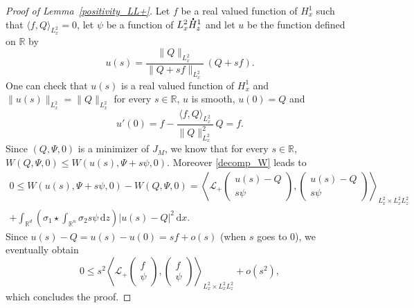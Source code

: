 \documentclass[10pt]{amsart}
\theoremstyle{definition}
\newcommand*{\overbigdot}[1]{%
\accentset{\mbox{\large\bfseries .}}{#1}}
\newenvironment{ProofOf}[1]{\begin{proof}[Proof of #1]}{\end{proof}}
\newcommand{\R}{\mathbb{R}}
\newcommand{\ud}{\, {\mathrm{d}}}
\begin{document}
\begin{ProofOf}{Lemma~\ref{positivity_LL+}}
Let $f$ be a real valued function of $H_{x}^{1}$ such that $\langle f,Q\rangle_{L_{x}^{2}}=0$, let $\psi$ be a function of $L_{x}^{2}\overbigdot{H}_{z}^{1}$ and let $u$ be the function defined on $\R$ by
\[
u(s)=\frac{\|Q\|_{L_{x}^{2}}}{\|Q+sf\|_{L_{x}^{2}}}\,(Q+sf).
\]
One can check that $u(s)$ is a real valued function of $H_{x}^{1}$ and $\|u(s)\|_{L_{x}^{2}}=\|Q\|_{L_{x}^{2}}$ for every $s\in\R$, $u$ is smooth, $u(0)=Q$ and
\[
u'(0)=f-\frac{\langle f,Q\rangle_{L_{x}^{2}}}{\|Q\|_{L_{x}^{2}}^{2}}\,Q=f.
\]
Since $(Q,\Psi,0)$ is a minimizer of $J_{M}$, we know that for every $s\in\R$, $W(Q,\Psi,0)\leq W(u(s),\Psi+s\psi,0)$. Moreover \eqref{decomp_W} leads to
\bgroup
{}
\begin{multline*}
0\leq W(u(s),\Psi+s\psi,0)-W(Q,\Psi,0)=\left\langle\mathcal{L}_{+}\begin{pmatrix} u(s)-Q\\s\psi \end{pmatrix},\begin{pmatrix} u(s)-Q\\s\psi \end{pmatrix}\right\rangle_{L_{x}^{2}\times L_{x}^{2}L_{z}^{2}}\\
+\int_{\R^{d}}\left(\sigma_{1}\star\int_{\R^{n}}\sigma_{2}s\psi\ud z\right)|u(s)-Q|^{2}\ud x.
\end{multline*}
\egroup
Since $u(s)-Q=u(s)-u(0)=sf+o(s)$ (when $s$ goes to $0$), we eventually obtain
\[
0\leq s^{2}\left\langle\mathcal{L}_{+}\begin{pmatrix} f\\\psi \end{pmatrix},\begin{pmatrix} f\\\psi \end{pmatrix}\right\rangle_{L_{x}^{2}\times L_{x}^{2}L_{z}^{2}}+o(s^{2}),
\]
which concludes the proof.
\end{ProofOf}
\end{document}
